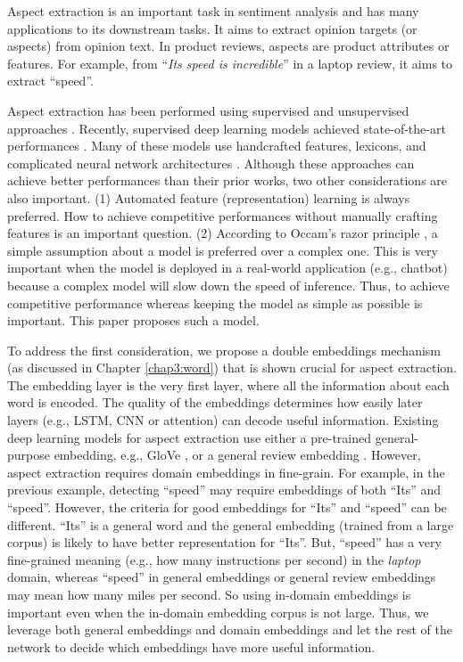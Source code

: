 Aspect extraction is an important task in sentiment analysis \cite{HuL2004} and has many applications to its downstream tasks\cite{Liu2012}.
It aims to extract opinion targets (or aspects) from opinion text. 
In product reviews, aspects are product attributes or features. 
For example, from ``\textit{Its speed is incredible}'' in a laptop review, it aims to extract ``speed''. 

Aspect extraction has been performed using supervised \cite{Jakob2010,chernyshevich2014ihs,shu2017lifelong} and unsupervised approaches \cite{HuL2004,ZhuangJZ2006,MeiLWSZ2007,QiuLBC2011,yin2016unsupervised,he2017unsupervised}. 
Recently, supervised deep learning models achieved state-of-the-art performances \cite{li2017deep}. Many of these models use handcrafted features, lexicons, and complicated neural network architectures \cite{poria2016aspect,wang2016recursive,wang2017coupled,li2017deep}. 
Although these approaches can achieve better performances than their prior works, two other considerations are also important.
(1) Automated feature (representation) learning is always preferred. 
How to achieve competitive performances without manually crafting features is an important question. 
(2) According to Occam's razor principle \cite{blumer1987occam}, a simple assumption about a model is preferred over a complex one.
This is very important when the model is deployed in a real-world application (e.g., chatbot) because a complex model will slow down the speed of inference. Thus, to achieve competitive performance whereas keeping the model as simple as possible is important. This paper proposes such a model. 

To address the first consideration, we propose a double embeddings mechanism (as discussed in Chapter \ref{chap3:word}) that is shown crucial for aspect extraction.
The embedding layer is the very first layer, where all the information about each word is encoded.
The quality of the embeddings determines how easily later layers (e.g., LSTM, CNN or attention) can decode useful information.
Existing deep learning models for aspect extraction use either a pre-trained general-purpose embedding, e.g., GloVe \cite{pennington2014glove}, or a general review embedding \cite{poria2016aspect}.
However, aspect extraction requires domain embeddings in fine-grain.
For example, in the previous example, detecting ``speed'' may require embeddings of both ``Its'' and ``speed''.
However, the criteria for good embeddings for ``Its'' and ``speed'' can be different.
``Its'' is a general word and the general embedding (trained from a large corpus) is likely to have better representation for ``Its''.
But, ``speed'' has a very fine-grained meaning (e.g., how many instructions per second) in the \textit{laptop} domain, whereas ``speed'' in general embeddings or general review embeddings may mean how many miles per second.
So using in-domain embeddings is important even when the in-domain embedding corpus is not large. 
Thus, we leverage both general embeddings and domain embeddings and let the rest of the network to decide which embeddings have more useful information.

